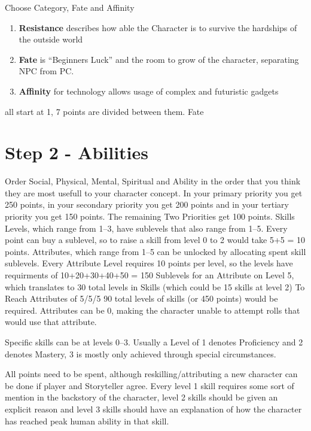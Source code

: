 \documentclass{book}
\begin{document}
    Choose Category, Fate and Affinity\par
    \begin{enumerate}
        \item \textbf{Resistance} describes how able the Character is to survive the hardships of the outside world
        \item \textbf{Fate} is ``Beginners Luck'' and the room to grow of the character, separating NPC from PC.
        \item \textbf{Affinity} for technology allows usage of complex and futuristic gadgets
    \end{enumerate}
    all start at 1, 7 points are divided between them.
    Fate

    \section{Step 2 - Abilities}\label{sec:step2-abilities}
    Order Social, Physical, Mental, Spiritual and Ability in the order that you think they are most
    usefull to your character concept. \newline
    In your primary priority you get 250 points, in your secondary priority you get 200 points and in your tertiary
    priority you get 150 points.
    The remaining Two Priorities get 100 points.\newline
    Skills Levels, which range from 1--3, have sublevels that also range from 1--5.
    Every point can buy a sublevel, so to raise a skill from level 0 to 2 would take 5+5 = 10 points.
    Attributes, which range from 1--5 can be unlocked by allocating spent skill sublevels.
    Every Attribute Level requires 10 points per level, so the levels have requirments of 10+20+30+40+50 = 150 Sublevels
    for an Attribute on Level 5, which translates to 30 total levels in Skills (which could be 15 skills at level 2)
    To Reach Attributes of 5/5/5 90 total levels of skills (or 450 points) would be required.
    Attributes can be 0, making the character unable to attempt rolls that would use that attribute.



    Specific skills can be at levels 0--3.
    Usually a Level of 1 denotes Proficiency and 2 denotes Mastery,
    3 is mostly only achieved through special circumstances.


    All points need to be spent, although reskilling/attributing a new character can be done if player and Storyteller
    agree.
    Every level 1 skill requires some sort of mention in the backstory of the character, level 2 skills should be given
    an explicit reason and level 3 skills should have an explanation of how the character has reached peak human ability
    in that skill.
\end{document}
